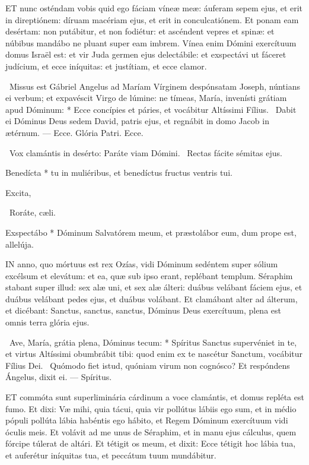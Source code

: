 
\lettrine[lines=2]{E}{T} nunc osténdam vobis quid ego fáciam víneæ meæ: áuferam sepem ejus, et erit in direptiónem: díruam macériam ejus, et erit in conculcatiónem. Et ponam eam desértam: non putábitur, et non fodiétur: et ascéndent vepres et spinæ: et núbibus mandábo ne pluant super eam imbrem. Vínea enim Dómini exercítuum domus Israël est: et vir Juda germen ejus delectábile: et exspectávi ut fáceret judícium, et ecce iníquitas: et justítiam, et ecce clamor.

\R\ Missus est Gábriel Angelus ad Maríam Vírginem despónsatam Joseph, núntians ei verbum; et expavéscit Virgo de lúmine: ne tímeas, María, invenísti grátiam apud Dóminum: * Ecce concípies et páries, et vocábitur Altíssimi Fílius. \V\ Dabit ei Dóminus Deus sedem David, patris ejus, et regnábit in domo Jacob in ætérnum. --- Ecce. Glória Patri. Ecce.

\V\ Vox clamántis in desérto: Paráte viam Dómini. \R\ Rectas fácite sémitas ejus.

 Benedícta * tu in muliéribus, et benedíctus fructus ventris tui.

 Excita, 

\V\ Roráte, cæli.

 Exspectábo * Dóminum Salvatórem meum, et præstolábor eum, dum prope est, allelúja.




\lettrine[lines=2]{I}{N} anno, quo mórtuus est rex Ozías, vidi Dóminum sedéntem super sólium excélsum et elevátum: et ea, quæ sub ipso erant, replébant templum. Séraphim stabant super illud: sex alæ uni, et sex alæ álteri: duábus velábant fáciem ejus, et duábus velábant pedes ejus, et duábus volábant. Et clamábant alter ad álterum, et dicébant: Sanctus, sanctus, sanctus, Dóminus Deus exercítuum, plena est omnis terra glória ejus.

\R\ Ave, María, grátia plena, Dóminus tecum: * Spíritus Sanctus supervéniet in te, et virtus Altíssimi obumbrábit tibi: quod enim ex te nascétur Sanctum, vocábitur Fílius Dei. \V\ Quómodo fiet istud, quóniam virum non cognósco? Et respóndens Ángelus, dixit ei. --- Spíritus.


\lettrine[lines=2]{E}{T} commóta sunt superliminária cárdinum a voce clamántis, et domus repléta est fumo. Et dixi: Væ mihi, quia tácui, quia vir pollútus lábiis ego sum, et in médio pópuli pollúta lábia habéntis ego hábito, et Regem Dóminum exercítuum vidi óculis meis. Et volávit ad me unus de Séraphim, et in manu ejus cálculus, quem fórcipe túlerat de altári. Et tétigit os meum, et dixit: Ecce tétigit hoc lábia tua, et auferétur iníquitas tua, et peccátum tuum mundábitur.


